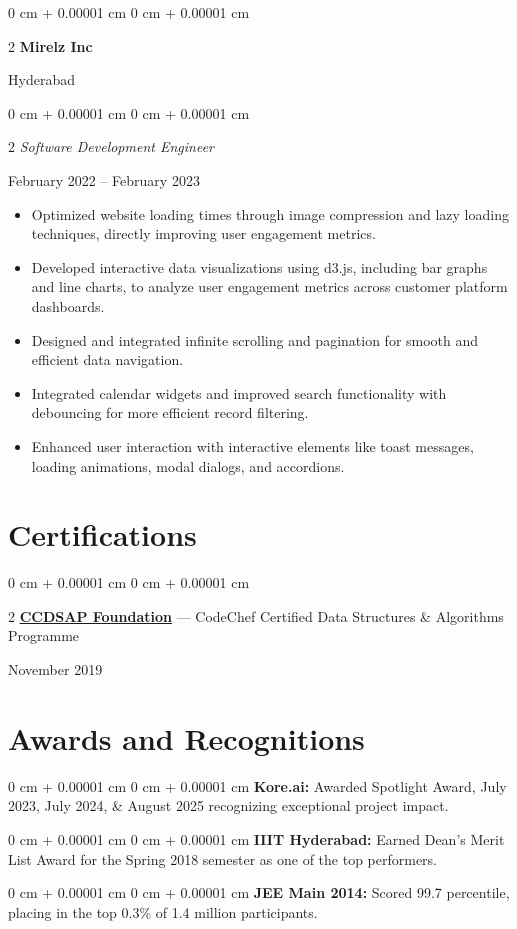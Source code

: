 \documentclass[10pt, letterpaper]{article}
\newenvironment{onecolentry}{
    \begin{adjustwidth}{
        0 cm + 0.00001 cm
    }{
        0 cm + 0.00001 cm
    }
}{
    \end{adjustwidth}
} %
\newenvironment{twocolentry}[2][]{
    \onecolentry
    \def\secondColumn{#2}
    \setcolumnwidth{\fill, 5.5 cm}
    \begin{paracol}{2}
}{
    \switchcolumn \raggedleft \secondColumn
    \end{paracol}
    \endonecolentry
} %
\let\hrefWithoutArrow\href
\newcommand{\resumeItemNH}[1]{
  \item\small{
    {#1 \vspace{-2pt}}
  }
}
\newcommand{\onecolentrybold}[2]{%
\begin{onecolentry}%
\textbf{#1:} #2%
\end{onecolentry}%
}
\newcommand{\onecolentrywrapbullet}[1]{%
  \begin{itemize}[leftmargin=*, itemsep=0pt, parsep=0pt, topsep=0pt, partopsep=0pt] %
    \item \begin{minipage}[t]{\dimexpr\textwidth-1.1em\relax} %
       #1
    \end{minipage}
  \end{itemize}
  \vspace{4pt}
}
\newcommand{\twocolentryWithSpace}[3][0.5em]{%
  \begin{twocolentry}{#2}{#3}%
  \end{twocolentry}%
  \vspace{#1}%
}
\begin{document}
\begin{twocolentry}
   {Hyderabad} {\textbf{Mirelz Inc}}
\end{twocolentry}
\twocolentryWithSpace[0.5em]{February 2022 -- February 2023}{\textit{Software Development Engineer}}


\onecolentrywrapbullet{Optimized website loading times through image compression and lazy loading techniques, directly improving user engagement metrics.}
\onecolentrywrapbullet{Developed interactive data visualizations using d3.js, including bar graphs and line charts, to analyze user engagement metrics across customer platform dashboards.}
\onecolentrywrapbullet{Designed and integrated infinite scrolling and pagination for smooth and efficient data navigation.}
\onecolentrywrapbullet{Integrated calendar widgets and improved search functionality with debouncing for more efficient record filtering.}
\onecolentrywrapbullet{Enhanced user interaction with interactive elements like toast messages, loading animations, modal dialogs, and accordions.}



\section{Certifications}

\begin{twocolentry}
{November 2019}{\hrefWithoutArrow{https://www.codechef.com/certificates/public/0d07532}{{\color{linkedinBlue}\textbf{CCDSAP Foundation}}} --- CodeChef Certified Data Structures \& Algorithms Programme}
\end{twocolentry}

\vspace{0.1cm}


\section{Awards and Recognitions}

\onecolentrybold {Kore.ai} {Awarded Spotlight Award, July 2023, July 2024, \& August 2025 recognizing exceptional project impact.}
\onecolentrybold {IIIT Hyderabad} {Earned Dean’s Merit List Award for the Spring 2018 semester as one of the top performers.}
\onecolentrybold{JEE Main 2014}{Scored 99.7 percentile, placing in the top 0.3\% of 1.4 million participants.}
\end{document}
